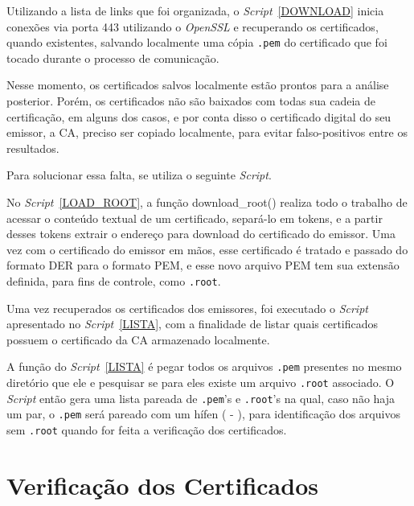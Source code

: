 		Utilizando a lista de links que foi organizada, o \textit{Script}~\ref{DOWNLOAD} inicia conexões via porta 443 utilizando o \textit{OpenSSL} e recuperando os certificados, quando existentes, salvando localmente uma cópia \texttt{.pem} do certificado que foi tocado durante o processo de comunicação.
		
		
		Nesse momento, os certificados salvos localmente estão prontos para a análise posterior. Porém, os certificados não são baixados com todas sua cadeia de certificação, em alguns dos casos, e por conta disso o certificado digital do seu emissor, a CA, preciso ser copiado localmente, para evitar falso-positivos entre os resultados.
		
		Para solucionar essa falta, se utiliza o seguinte \textit{Script}.
		
		
		No \textit{Script}~\ref{LOAD_ROOT}, a função download\_root() realiza todo o trabalho de acessar o conteúdo textual de um certificado, separá-lo em tokens, e  a partir desses tokens extrair o endereço para download do certificado do emissor. Uma vez com o certificado do emissor em mãos, esse certificado é tratado e passado do formato DER para o formato PEM, e esse novo arquivo PEM tem sua extensão definida, para fins de controle, como \texttt{.root}.
		
		Uma vez recuperados os certificados dos emissores, foi executado o \textit{Script} apresentado no \textit{Script}~\ref{LISTA}, com a finalidade de listar quais certificados possuem o certificado da CA armazenado localmente.

		
		A função do \textit{Script}~\ref{LISTA} é pegar todos os arquivos \texttt{.pem} presentes no mesmo diretório que ele e pesquisar se para eles existe um arquivo \texttt{.root} associado. O \textit{Script} então gera uma lista pareada de \texttt{.pem}'s e \texttt{.root}'s na qual, caso não haja um par, o \texttt{.pem} será pareado com um hífen ( - ), para identificação dos arquivos sem \texttt{.root} quando for feita a verificação dos certificados.

		\section[Verificação dos Certificados]{Verificação dos Certificados}

